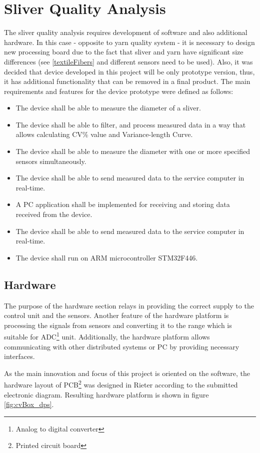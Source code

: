 \documentclass[twoside]{ctuthesis}
\theoremstyle{plain}
\theoremstyle{definition}
\theoremstyle{note}
\begin{document}
\section{Sliver Quality Analysis}
 The sliver quality analysis requires development of software and also additional hardware. In this case - opposite to yarn quality system - it is necessary to design new processing board due to the fact that sliver and yarn have significant size differences (see \ref{textileFibers} and different sensors need to be used). Also, it was decided that device developed in this project will be only prototype version, thus, it has additional functionality that can be removed in a final product. The main requirements and features for the device prototype were defined as follows:
\begin{itemize}
	\setlength{\itemsep}{5pt}
	\item The device shall be able to measure the diameter of a sliver.
	\item The device shall be able to filter, and process measured data in a way that allows calculating CV\% value and Variance-length Curve.
	\item The device shall be able to measure the diameter with one or more specified sensors simultaneously.
	\item The device shall be able to send measured data to the service computer in real-time.
	\item A PC application shall be implemented for receiving and storing data received from the device.
	\item The device shall be able to send measured data to the service computer in real-time.
	\item The device shall run on ARM microcontroller STM32F446.
\end{itemize}
\subsection{Hardware}
The purpose of the hardware section relays in providing the correct supply to the control unit and the sensors. Another feature of the hardware platform is processing the signals from sensors and converting it to the range which is suitable for ADC\footnote{Analog to digital converter} unit. Additionally, the hardware platform allows communicating with other distributed systems or PC by providing necessary interfaces. 

As the main innovation and focus of this project is oriented on the software, the hardware layout of PCB\footnote{Printed circuit board} was designed in Rieter according to the submitted electronic diagram. Resulting hardware platform is shown in figure \ref{fig:cvBox_dps}.
\end{document}
